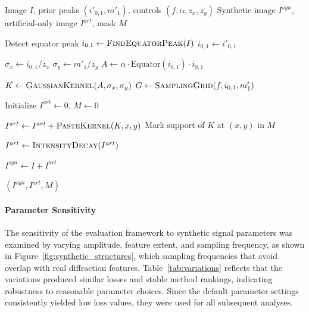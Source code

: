 \documentclass[iucr]{iucrjournals}
\begin{document}
\begin{algorithm}[htbp]
\centering
\begin{minipage}{0.96\columnwidth}
\begin{algorithmic}[1]

\Require Image $I$, prior peaks $(i'_{0,1}, m'_1)$, controls $(f, \alpha, z_x, z_y)$
\Ensure Synthetic image $I^{syn}$, artificial-only image $I^{art}$, mask $M$

\State Detect equator peak $i_{0,1} \leftarrow \textsc{FindEquatorPeak}(I)$
    \State $i_{0,1} \leftarrow i'_{0,1}$
\EndIf

\State $\sigma_x \leftarrow i_{0,1} / z_x$
\State $\sigma_y \leftarrow m'_1 / z_y$
\State $A \leftarrow \alpha \cdot \text{Equator}(i_{0,1}) \cdot i_{0,1}$

\State $K \leftarrow \textsc{GaussianKernel}(A, \sigma_x, \sigma_y)$
\State $G \leftarrow \textsc{SamplingGrid}(f, i_{0,1}, m'_1)$

\State Initialize $I^{art} \leftarrow 0$, $M \leftarrow 0$

    \State $I^{art} \leftarrow I^{art} + \textsc{PasteKernel}(K, x, y)$
    \State Mark support of $K$ at $(x,y)$ in $M$
\EndFor

\State $I^{art} \gets \textsc{IntensityDecay}(I^{art})$

\State $I^{syn} \leftarrow I + I^{art}$

\State \Return $(I^{syn}, I^{art}, M)$

\end{algorithmic}
\end{minipage}
\caption{Procedure for synthetic-feature generation and mask construction used for validation in the absence of ground-truth background.}
\label{alg:synthetic_signal}
\end{algorithm}


\paragraph{Parameter Sensitivity}
The sensitivity of the evaluation framework to synthetic signal parameters was examined by varying amplitude, feature extent, and sampling frequency, as shown in Figure~\ref{fig:synthetic_structures}, which sampling frequencies that avoid overlap with real diffraction features. Table~\ref{tab:variations} reflects that the variations produced similar losses and stable method rankings, indicating robustness to reasonable parameter choices. Since the default parameter settings consistently yielded low loss values, they were used for all subsequent analyses.
\end{document}
